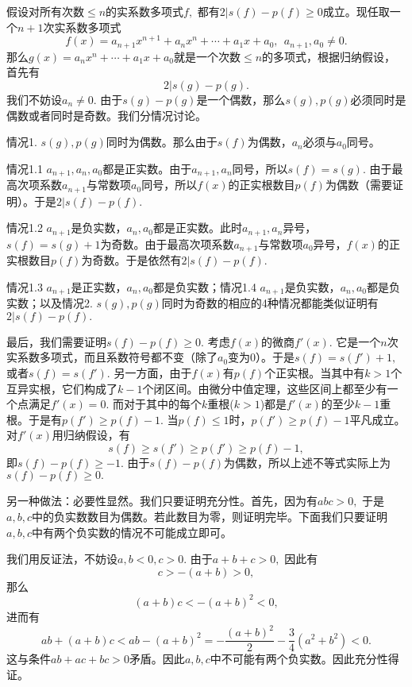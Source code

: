 假设对所有次数$\leqslant n$的实系数多项式$f,$ 都有$2 | s(f) - p(f) \geqslant 0$成立。现任取一个$n+1$次实系数多项式
$$f(x) = a_{n+1}x^{n+1} + a_nx^n + \cdots + a_1x + a_0, ~~ a_{n+1}, a_0 \neq 0.$$
那么$g(x) = a_nx^n + \cdots + a_1x + a_0$就是一个次数$\leqslant n$的多项式，根据归纳假设，首先有
$$2 | s(g) - p(g).$$
我们不妨设$a_n \neq 0.$ 由于$s(g) - p(g)$是一个偶数，那么$s(g), p(g)$必须同时是偶数或者同时是奇数。我们分情况讨论。

情况1. $s(g), p(g)$同时为偶数。那么由于$s(f)$为偶数，$a_n$必须与$a_0$同号。

情况1.1 $a_{n+1}, a_n, a_0$都是正实数。由于$a_{n+1}, a_n$同号，所以$s(f) = s(g).$ 由于最高次项系数$a_{n+1}$与常数项$a_0$同号，所以$f(x)$的正实根数目$p(f)$为偶数（需要证明）。于是$2 | s(f) - p(f).$

情况1.2 $a_{n+1}$是负实数，$a_n, a_0$都是正实数。此时$a_{n+1}, a_n$异号，$s(f) = s(g) + 1$为奇数。由于最高次项系数$a_{n+1}$与常数项$a_0$异号，$f(x)$的正实根数目$p(f)$为奇数。于是依然有$2 | s(f) - p(f).$

情况1.3 $a_{n+1}$是正实数，$a_n, a_0$都是负实数；情况1.4 $a_{n+1}$是负实数，$a_n, a_0$都是负实数；以及情况2. $s(g), p(g)$同时为奇数的相应的4种情况都能类似证明有$2 | s(f) - p(f).$

最后，我们需要证明$s(f) - p(f) \geqslant 0.$ 考虑$f(x)$的微商$f'(x).$ 它是一个$n$次实系数多项式，而且系数符号都不变（除了$a_0$变为0）。于是$s(f) = s(f') + 1,$ 或者$s(f) = s(f').$ 另一方面，由于$f(x)$有$p(f)$个正实根。当其中有$k > 1$个互异实根，它们构成了$k - 1$个闭区间。由微分中值定理，这些区间上都至少有一个点满足$f'(x) = 0.$ 而对于其中的每个$k$重根($k > 1$)都是$f'(x)$的至少$k-1$重根。于是有$p(f') \geqslant p(f) - 1.$ 当$p(f) \leqslant 1$时，$p(f') \geqslant p(f) - 1$平凡成立。对$f'(x)$用归纳假设，有
$$s(f) \geqslant s(f') \geqslant p(f') \geqslant p(f) - 1,$$
即$s(f) - p(f) \geqslant -1.$ 由于$s(f) - p(f)$为偶数，所以上述不等式实际上为$s(f) - p(f) \geqslant 0.$

\vspace{1em}

另一种做法：必要性显然。我们只要证明充分性。首先，因为有$abc > 0,$ 于是$a, b, c$中的负实数数目为偶数。若此数目为零，则证明完毕。下面我们只要证明$a, b, c$中有两个负实数的情况不可能成立即可。

我们用反证法，不妨设$a, b < 0, c > 0.$ 由于$a + b + c > 0,$ 因此有
$$c > -(a + b) > 0,$$
那么
$$(a + b)c < -(a + b)^2 < 0,$$
进而有
$$ab + (a + b)c < ab - (a + b)^2 = -\dfrac{(a + b)^2}{2} - \dfrac{3}{4}(a^2 + b^2) < 0.$$
这与条件$ab + ac + bc > 0$矛盾。因此$a, b, c$中不可能有两个负实数。因此充分性得证。

